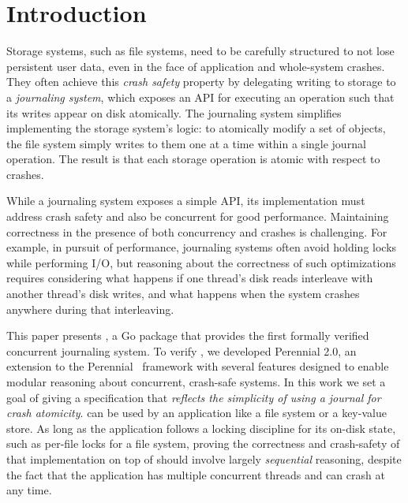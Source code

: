 \section{Introduction}



Storage systems, such as file systems, need to be carefully structured
to not lose persistent user data, even in the face of application and
whole-system crashes. They often achieve this \emph{crash safety}
property by delegating writing to storage to a \emph{journaling
system}, which exposes an API for executing an operation such that its
writes appear on disk atomically. The journaling system simplifies
implementing the storage system's logic: to atomically modify a set of
objects, the file system simply writes to them one at a time within a single
journal operation.  The result is that each storage operation is atomic with
respect to crashes.

While a journaling system exposes a simple API, its implementation must address
crash safety and also be concurrent for good performance.
Maintaining correctness in the presence of both concurrency and crashes is
challenging.  For example, in pursuit of performance, journaling systems
often avoid holding locks while performing I/O, but reasoning
about the correctness of such optimizations requires considering what
happens if one thread's disk reads interleave with another thread's
disk writes, and what happens when the system crashes anywhere
during that interleaving.

This paper presents \txn, a Go package that provides the first formally verified concurrent journaling
system. To verify \txn, we developed Perennial 2.0, an extension to the Perennial~\citep{chajed:perennial} framework
with several features designed to enable modular reasoning about concurrent, crash-safe systems.
In this work we set a goal of giving
\txn a specification that \emph{reflects the simplicity of using a journal for
crash atomicity}.
\txn can be used by an application like a file system or a key-value
store. As long as the application follows a locking discipline
for its on-disk state, such as per-file locks for a file system, proving the correctness
and crash-safety of that implementation on top of \txn should involve
largely \emph{sequential} reasoning, despite the fact that the application
has multiple concurrent threads and can crash at any time.

